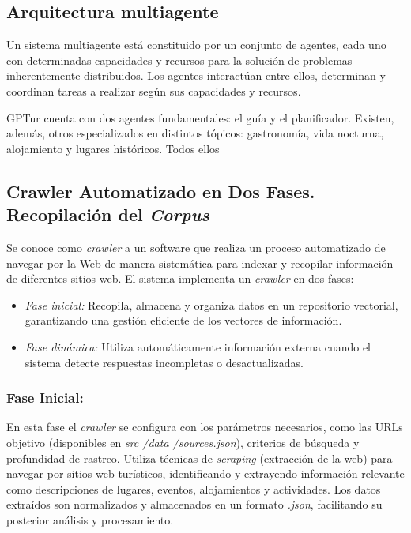 \documentclass[10pt]{llncs}
\begin{document}
\vspace{\baselineskip}
\subsection{Arquitectura multiagente}

Un sistema multiagente está constituido por un conjunto de agentes, cada uno con determinadas capacidades y recursos para la solución de problemas inherentemente distribuidos. Los agentes interactúan entre ellos, determinan y coordinan tareas a realizar según sus capacidades y recursos.

GPTur cuenta con dos agentes fundamentales: el guía y el planificador. Existen, además, 
otros especializados en distintos tópicos: gastronomía, vida nocturna, alojamiento y lugares históricos. Todos ellos 

\vspace{\baselineskip}
\subsection{Crawler Automatizado en Dos Fases. Recopilación del \textit{Corpus}}

Se conoce como \textit{crawler} a un software que realiza un proceso automatizado de navegar por la Web de manera sistemática para indexar y recopilar
información de diferentes sitios web. El sistema implementa un \textit{crawler} en dos fases:
\begin{itemize}
  \item  \textit{Fase inicial:} Recopila, almacena y organiza datos en un repositorio vectorial,
 garantizando una gestión eficiente de los vectores de información.
  \item \textit{Fase dinámica:} Utiliza automáticamente información externa cuando el sistema
 detecte respuestas incompletas o desactualizadas.
\end{itemize}

\subsubsection{Fase Inicial:} En esta fase el \textit{crawler} se configura con los parámetros necesarios, como las URLs objetivo (disponibles en \textit{src /data /sources.json}), 
criterios de búsqueda y profundidad de rastreo. Utiliza técnicas de \textit{scraping} (extracción de la web) para navegar por sitios web turísticos, identificando y extrayendo 
información relevante como descripciones de lugares, eventos, alojamientos y actividades. Los datos extraídos son normalizados y almacenados en un formato \textit{.json}, facilitando su posterior análisis y procesamiento.
\end{document}
